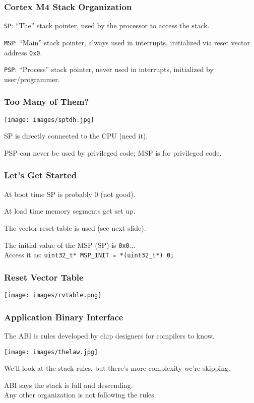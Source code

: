 \begin{frame}
\frametitle{Cortex M4 Stack Organization}

\texttt{SP}: ``The'' stack pointer, used by the processor to access the stack.

\texttt{MSP}: ``Main'' stack pointer, always used in interrupts, initialized via reset vector address \texttt{0x0}.

\texttt{PSP}: ``Process'' stack pointer, never used in interrupts, initialized by user/programmer.


\end{frame}


\begin{frame}
\frametitle{Too Many of Them?}

\begin{center}
	\texttt{[image: images/sptdh.jpg]}
\end{center}

SP is directly connected to the CPU (need it).

PSP can never be used by privileged code; MSP is for privileged code.

\end{frame}


\begin{frame}
\frametitle{Let's Get Started}

At boot time SP is probably 0 (not good).

At load time memory segments get set up.

The vector reset table is used (see next slide).

The initial value of the MSP (SP) is \texttt{0x0}...\\
\quad Access it as: \texttt{uint32\_t* MSP\_INIT = *(uint32\_t*) 0;}

\end{frame}



\begin{frame}
\frametitle{Reset Vector Table}

\begin{center}
	\texttt{[image: images/rvtable.png]}
\end{center}

\end{frame}


\begin{frame}
\frametitle{Application Binary Interface}

The ABI is rules developed by chip designers for compilers to know.

\begin{center}
	\texttt{[image: images/thelaw.jpg]}
\end{center}

We'll look at the stack rules, but there's more complexity we're skipping.

ABI says the stack is full and descending.\\
\quad Any other organization is not following the rules.

\end{frame}


